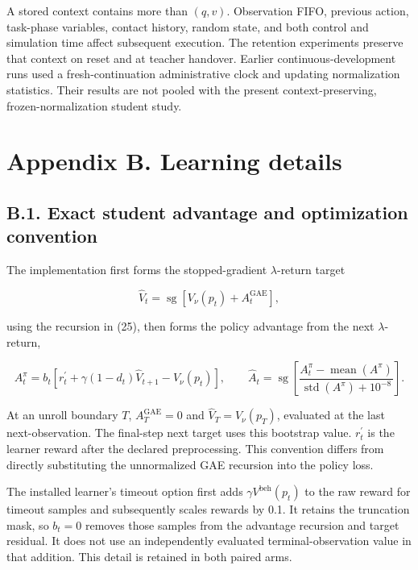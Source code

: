 \documentclass[
  american,
  11pt,
  a4paper,
]{article}
\begin{document}
A stored context contains more than \((q,v)\). Observation FIFO,
previous action, task-phase variables, contact history, random state,
and both control and simulation time affect subsequent execution. The
retention experiments preserve that context on reset and at teacher
handover. Earlier continuous-development runs used a fresh-continuation
administrative clock and updating normalization statistics. Their
results are not pooled with the present context-preserving,
frozen-normalization student study.

\section{Appendix B. Learning
details}\label{appendix-b.-learning-details}

\subsection{B.1. Exact student advantage and optimization
convention}\label{b.1.-exact-student-advantage-and-optimization-convention}

The implementation first forms the stopped-gradient \(\lambda\)-return
target

\[
\widehat V_t=\operatorname{sg}[V_\nu(p_t)+A_t^{\mathrm{GAE}}],
\tag{53}\label{eq:53}
\]

using the recursion in (25), then forms the policy advantage from the
next \(\lambda\)-return,

\[
A_t^\pi=
b_t\!\left[r_t^\prime+\gamma(1-d_t)\widehat V_{t+1}
-V_\nu(p_t)\right],\qquad
\widehat A_t=\operatorname{sg}\!\left[
\frac{A_t^\pi-\operatorname{mean}(A^\pi)}
{\operatorname{std}(A^\pi)+10^{-8}}\right].
\tag{54}\label{eq:54}
\]

At an unroll boundary \(T\), \(A_T^{\mathrm{GAE}}=0\) and
\(\widehat V_T=V_\nu(p_T)\), evaluated at the last next-observation. The
final-step next target uses this bootstrap value. \(r_t^\prime\) is the
learner reward after the declared preprocessing. This convention differs
from directly substituting the unnormalized GAE recursion into the
policy loss.

The installed learner's timeout option first adds
\(\gamma V^{\mathrm{beh}}(p_t)\) to the raw reward for timeout samples
and subsequently scales rewards by 0.1. It retains the truncation mask,
so \(b_t=0\) removes those samples from the advantage recursion and
target residual. It does not use an independently evaluated
terminal-observation value in that addition. This detail is retained in
both paired arms.
\end{document}
